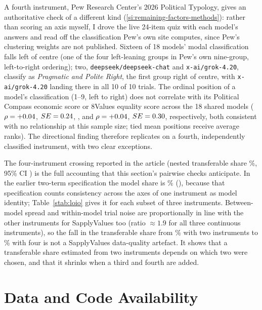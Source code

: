 \documentclass[12pt]{article}
\begin{document}
A fourth instrument, Pew Research Center's 2026 Political Typology, gives
an authoritative check of a different kind (\ref{si:remaining-factors-methods}):
rather than scoring an axis myself, I drove the live 24-item quiz with
each model's answers and read off the classification Pew's own site
computes, since Pew's clustering weights are not published. Sixteen of 18
models' modal classification falls left of centre (one of the four
left-leaning groups in Pew's own nine-group, left-to-right ordering);
two, \texttt{deepseek/deepseek-chat} and \texttt{x-ai/grok-4.20}, classify
as \emph{Pragmatic and Polite Right}, the first group right of centre, with
\texttt{x-ai/grok-4.20} landing there in all 10 of 10 trials. The ordinal
position of a model's classification (1--9, left to right) does not
correlate with its Political Compass economic score or 8Values equality
score across the 18 shared models ($\rho=+0.04$, $SE=0.24$, \RhoPewPCCI, and
$\rho=+0.04$, $SE=0.30$, \RhoPewEqCI{} respectively, both consistent with no
relationship at this sample size; tied mean positions receive average ranks). The directional finding therefore
replicates on a fourth, independently classified instrument, with two clear
exceptions.

The four-instrument crossing reported in the article (nested transferable
share \NFourM\%, 95\% CI \NFourMci) is the full accounting that this section's
pairwise checks anticipate. In the earlier two-term specification the model
share is \OFourM\% (\OFourMci), because that specification counts consistency
across the axes of one instrument as model identity; Table~\ref{stab:loio}
gives it for each subset of three instruments. Between-model spread and
within-model trial noise are proportionally in line with the other instruments
for SapplyValues too (ratio $\approx 1.9$ for all three continuous
instruments), so the fall in the transferable share from \NTwoM\% with two
instruments to \NFourM\% with four is not a SapplyValues data-quality
artefact. It shows that a transferable share estimated from two instruments
depends on which two were chosen, and that it shrinks when a third and fourth
are added.

\section{Data and Code Availability}
\label{si:availability}
\end{document}
